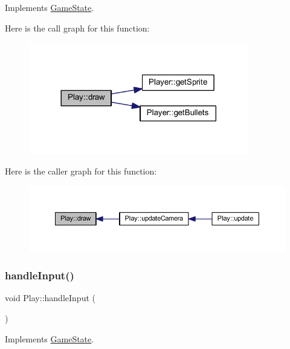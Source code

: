 Implements \hyperlink{class_game_state_ac872d748df12ac36d7a42a191997e4f7}{Game\+State}.

Here is the call graph for this function\+:
\nopagebreak
\begin{figure}[H]
\begin{center}
\leavevmode
\includegraphics[width=272pt]{class_play_a026d1354c1b7ac0df50b7108c78aec61_cgraph}
\end{center}
\end{figure}
Here is the caller graph for this function\+:
\nopagebreak
\begin{figure}[H]
\begin{center}
\leavevmode
\includegraphics[width=350pt]{class_play_a026d1354c1b7ac0df50b7108c78aec61_icgraph}
\end{center}
\end{figure}
\mbox{\label{class_play_a81bdbd1ef7b3de50dba1a8ebf346a1fc}} 
\subsubsection{\texorpdfstring{handle\+Input()}{handleInput()}}
{\footnotesize\ttfamily void Play\+::handle\+Input (\begin{DoxyParamCaption}{ }\end{DoxyParamCaption})\hspace{0.3cm}{\ttfamily [virtual]}}



Implements \hyperlink{class_game_state_a970b55edd5a1da31ea0f7113e2c1f85a}{Game\+State}.


